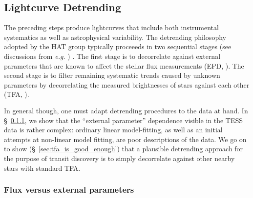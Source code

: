 \documentclass[12pt,twocolumn,tighten]{aastex62}
\begin{document}
\subsection{Lightcurve Detrending}
\label{subsec:lcdetrending}

The preceding steps produce lightcurves that include both instrumental
systematics as well as astrophysical variability.  The detrending
philosophy adopted by the HAT group typically proceeeds in two
sequential stages (see discussions from {\it e.g.}
\citealt{bakos_2010,huang_high-precision_2015,zhang_precision_2016}) .
The first stage is to decorrelate against external parameters that are
known to affect the stellar flux measurements (EPD,
\citealt{bakos_2010}). The second stage is to filter remaining
systematic trends caused by unknown parameters by decorrelating the
measured brightnesses of stars against each other (TFA,
\citealt{kovacs_trend_2005}).  

In general though, one must adapt detrending procedures to the data at
hand.  In \S~\ref{sec:flux_vs_external_parameters}, we show that the
``external parameter'' dependence visible in the TESS data is rather
complex: ordinary linear model-fitting, as well as an initial attempts
at non-linear model fitting, are poor descriptions of the data.  We go
on to show (\S~\ref{sec:tfa_is_good_enough}) that a plausible
detrending approach for the purpose of transit discovery is to simply
decorrelate against other nearby stars with standard TFA.


\subsubsection{Flux versus external parameters}
\label{sec:flux_vs_external_parameters}
\end{document}
